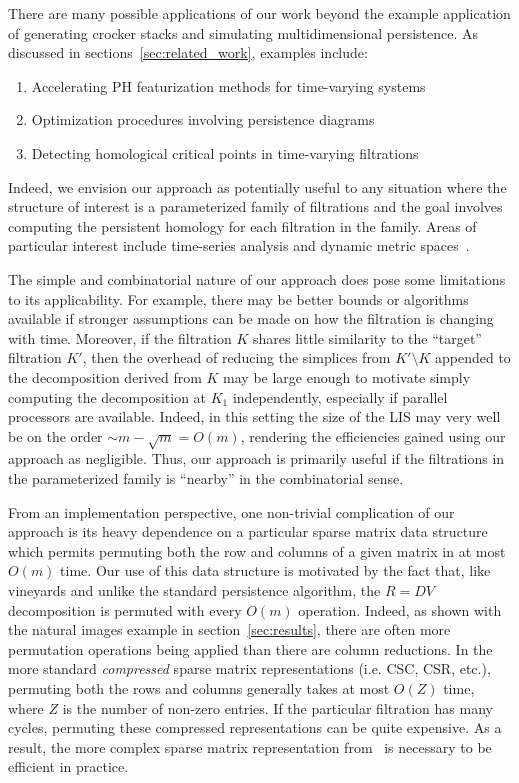 \documentclass[sn-mathphys]{sn-jnl}
\begin{document}
There are many possible applications of our work beyond the example application of generating crocker stacks and simulating multidimensional persistence. As discussed in sections~\ref{sec:related_work}, examples include: 
\begin{enumerate}
	\item Accelerating PH featurization methods for time-varying systems 
	\item Optimization procedures involving persistence diagrams
	\item Detecting homological critical points in time-varying filtrations
\end{enumerate}
Indeed, we envision our approach as potentially useful to any situation where the structure of interest is a parameterized family of filtrations and the goal involves computing the persistent homology for each filtration in the family. Areas of particular interest include time-series analysis and dynamic metric spaces~\cite{kim2020spatiotemporal}. 

The simple and combinatorial nature of our approach does pose some limitations to its applicability. For example, there may be better bounds or algorithms available if stronger assumptions can be made on how the filtration is changing with time. Moreover, if the filtration $K$ shares little similarity to the ``target'' filtration $K'$, then the overhead of reducing the simplices from $K' \setminus K$ appended to the decomposition derived from $K$ may be large enough to motivate simply computing the decomposition at $K_1$ independently, especially if parallel processors are available. Indeed, in this setting the size of the LIS may very well be on the order $\sim m - \sqrt{m}  = O(m)$, rendering the efficiencies gained using our approach as negligible. 
Thus, our approach is primarily useful if the filtrations in the parameterized family is ``nearby'' in the combinatorial sense. 

From an implementation perspective, one non-trivial complication of our approach is its heavy dependence on a particular sparse matrix data structure which permits permuting both the row and columns of a given matrix in at most $O(m)$ time. Our use of this data structure is motivated by the fact that, like vineyards and unlike the standard persistence algorithm, the $R = DV$ decomposition is permuted with every $O(m)$ operation. Indeed, as shown with the natural images example in section~\ref{sec:results}, there are often more permutation operations being applied than there are column reductions. In the more standard \emph{compressed} sparse matrix representations (i.e. CSC, CSR, etc.), permuting both the rows and columns generally takes at most $O(Z)$ time, where $Z$ is the number of non-zero entries. If the particular filtration has many cycles, permuting these compressed representations can be quite expensive. As a result, the more complex sparse matrix representation from~\cite{cohen2006vines} is necessary to be efficient in practice. 
\end{document}

